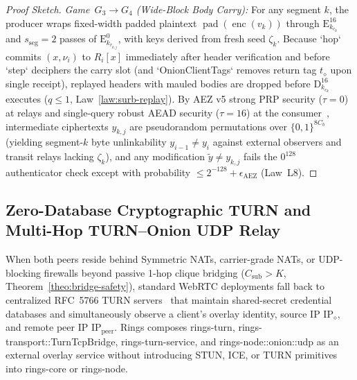 \documentclass[journal]{IEEEtran}
\DeclareRobustCommand{\code}[1]{{\ttfamily\renewcommand{\_}{\textunderscore\allowbreak}#1}}
\begin{document}
\begin{proof}[Proof Sketch]
\emph{Game~$G_3\to G_4$ (Wide-Block Body Carry):} For any segment $k$, the producer wraps fixed-width padded plaintext $\operatorname{pad}(\operatorname{enc}(v_k))$ through $\mathrm{E}^{16}_{k_{c_k}}$ and $s_{\mathrm{seg}}=2$ passes of $\mathrm{E}^0_{k_{r_{k,j}}}$, with keys derived from fresh seed $\zeta_k$. Because `hop` commits $(x,\nu_i)$ to $R_i[x]$ immediately after header verification and before `step` deciphers the carry slot (and `OnionClientTags` removes return tag $t_\diamond$ upon single receipt), replayed headers with mauled bodies are dropped before $\mathrm{D}^{16}_{k_{c_k}}$ executes ($q\le 1$, Law~\ref{law:surb-replay}). By AEZ v5 strong PRP security ($\tau=0$) at relays and single-query robust AEAD security ($\tau=16$) at the consumer~\cite{Hoang2015,Degabriele2018}, intermediate ciphertexts $y_{k,j}$ are pseudorandom permutations over $\{0,1\}^{8C_b}$ (yielding segment-$k$ byte unlinkability $y_{i-1}\neq y_i$ against external observers and transit relays lacking $\zeta_k$), and any modification $\tilde{y}\neq y_{k,j}$ fails the $0^{128}$ authenticator check except with probability $\le 2^{-128}+\epsilon_{\mathrm{AEZ}}$ (Law~L8).
\end{proof}

\subsection{Zero-Database Cryptographic TURN and Multi-Hop TURN--Onion UDP Relay}\label{sec:turn-onion}

When both peers reside behind Symmetric NATs, carrier-grade NATs, or UDP-blocking firewalls beyond passive 1-hop clique bridging ($C_{\mathrm{sub}}>K$, Theorem~\ref{theo:bridge-safety}), standard WebRTC deployments fall back to centralized RFC~5766 TURN servers~\cite{RFC5389,RFC5766} that maintain shared-secret credential databases and simultaneously observe a client's overlay identity, source IP $\mathrm{IP}_\diamond$, and remote peer IP $\mathrm{IP}_{\mathrm{peer}}$. Rings composes \code{rings-turn}, \code{rings-transport::\allowbreak TurnTcpBridge}, \code{rings-turn-service}, and \code{rings-node::\allowbreak onion::\allowbreak udp} as an external overlay service without introducing STUN, ICE, or TURN primitives into \code{rings-core} or \code{rings-node}.
\end{document}
